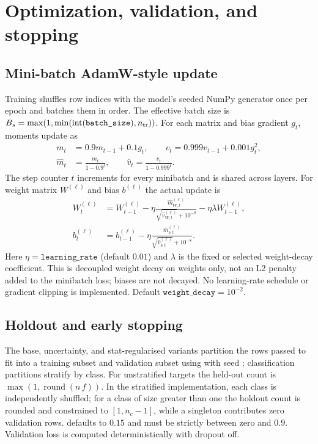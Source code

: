 \documentclass[conference]{IEEEtran}
\begin{document}
\section{Optimization, validation, and stopping}
\subsection{Mini-batch AdamW-style update}
Training shuffles row indices with the model's seeded NumPy generator once per epoch and batches them in order. The effective batch size is $B_s=\max(1,\min(\operatorname{int}(\texttt{batch\_size}),n_{\rm tr}))$. For each matrix and bias gradient $g_t$, moments update as
\begin{align}
 m_t&=0.9m_{t-1}+0.1g_t,\qquad v_t=0.999v_{t-1}+0.001g_t^2,\\
 \hat m_t&=\frac{m_t}{1-0.9^t},\qquad \hat v_t=\frac{v_t}{1-0.999^t}.
 \label{eq:adam}
\end{align}
The step counter $t$ increments for every minibatch and is shared across layers. For weight matrix $W^{(\ell)}$ and bias $b^{(\ell)}$ the actual update is
\begin{align}
 W_t^{(\ell)}&=W_{t-1}^{(\ell)}-\eta\frac{\hat m_{W,t}^{(\ell)}}{\sqrt{\hat v_{W,t}^{(\ell)}}+10^{-8}}-\eta\lambda W_{t-1}^{(\ell)},\\
 b_t^{(\ell)}&=b_{t-1}^{(\ell)}-\eta\frac{\hat m_{b,t}^{(\ell)}}{\sqrt{\hat v_{b,t}^{(\ell)}}+10^{-8}}.
 \label{eq:adamw}
\end{align}
Here $\eta=\texttt{learning\_rate}$ (default $0.01$) and $\lambda$ is the fixed or selected weight-decay coefficient. This is decoupled weight decay on weights only, not an L2 penalty added to the minibatch loss; biases are not decayed. No learning-rate schedule or gradient clipping is implemented. Default $\texttt{weight\_decay}=10^{-2}$.

\subsection{Holdout and early stopping}
The base, uncertainty, and stat-regularised variants partition the rows passed to fit into a training subset and validation subset using  with seed ; classification partitions stratify by class. For unstratified targets the held-out count is $\max(1,\operatorname{round}(n\,f))$. In the stratified implementation, each class is independently shuffled; for a class of size greater than one the holdout count is rounded and constrained to $[1,n_c-1]$, while a singleton contributes zero validation rows.  defaults to $0.15$ and must be strictly between zero and $0.9$. Validation loss is computed deterministically with dropout off.
\end{document}
